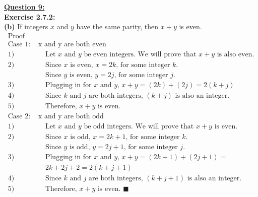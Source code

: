 \documentclass[12pt, letterpaper, twoside]{article}
\begin{document}
\newpage
\noindent \textbf{\underline{Question 9:}}\\
\noindent \textbf{Exercise 2.7.2:}\\
\break
\textbf{(b)} If integers $x$ and $y$ have the same parity, then $x + y$ is even.\\
\begin{align*}
    \text{Proof} &\\
    \text{Case 1: } & \text{x and y are both even} \\
    1) & \quad \text{Let $x$ and $y$ be even integers. We will prove that $x + y$ is also even.}\\
    2) & \quad \text{Since $x$ is even, $x = 2k$, for some integer $k$.}\\
       & \quad \text{Since $y$ is even, $y = 2j$, for some integer $j$.}\\
    3) & \quad \text{Plugging in for $x$ and $y$, $x + y = (2k) + (2j) = 2(k + j)$}\\
    4) & \quad \text{Since $k$ and $j$ are both integers, $(k + j)$ is also an integer.} \\
    5) & \quad \text{Therefore, $x + y$ is even.}\\
    \text{Case 2: } & \text{x and y are both odd} \\
    1) & \quad \text{Let $x$ and $y$ be odd integers. We will prove that $x + y$ is even.}\\
    2) & \quad \text{Since $x$ is odd, $x = 2k + 1$, for some integer $k$.}\\
       & \quad \text{Since $y$ is odd, $y = 2j + 1$, for some integer $j$.}\\
    3) & \quad \text{Plugging in for $x$ and $y$, $x + y = (2k + 1) + (2j + 1) =$}\\        & \quad \text{$2k + 2j + 2 = 2(k + j + 1)$}\\
    4) & \quad \text{Since $k$ and $j$ are both integers, $(k + j + 1)$ is also an integer.} \\
    5) & \quad \text{Therefore, $x + y$ is even. }\blacksquare\\
\end{align*}
\end{document}

